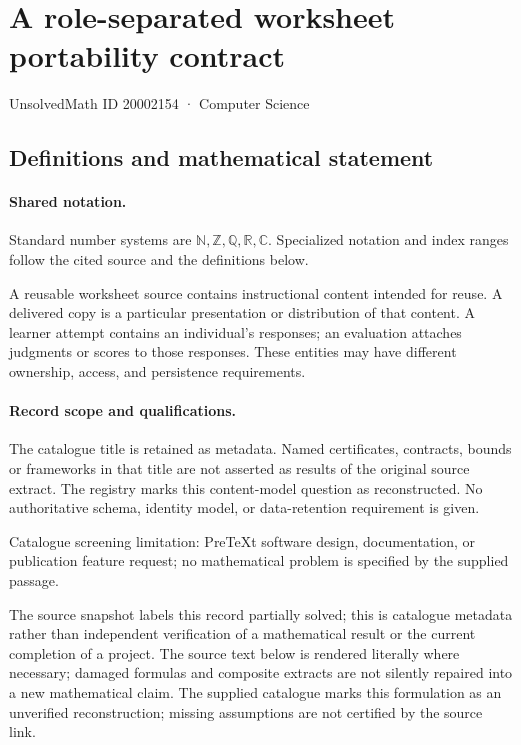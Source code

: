\documentclass[11pt]{article}
\begin{document}
\setcounter{section}{20002153}
\section{A role-separated worksheet portability contract}\label{20002154}
{\small\sffamily UnsolvedMath ID 20002154 · Computer Science}
\subsection{Definitions and mathematical statement}

\paragraph{Shared notation.}Standard number systems are $\mathbb N,\mathbb Z,\mathbb Q,\mathbb R,\mathbb C$. Specialized notation and index ranges follow the cited source and the definitions below.


A reusable worksheet source contains instructional content intended for reuse. A delivered copy is a particular presentation or distribution of that content. A learner attempt contains an individual's responses; an evaluation attaches judgments or scores to those responses. These entities may have different ownership, access, and persistence requirements.
\paragraph{Record scope and qualifications.}
The catalogue title is retained as metadata. Named certificates, contracts, bounds or frameworks in that title are not asserted as results of the original source extract.
The registry marks this content-model question as reconstructed. No authoritative schema, identity model, or data-retention requirement is given.

Catalogue screening limitation: PreTeXt software design, documentation, or publication feature request; no mathematical problem is specified by the supplied passage.

The source snapshot labels this record partially solved; this is catalogue metadata rather than independent verification of a mathematical result or the current completion of a project.
The source text below is rendered literally where necessary; damaged formulas and composite extracts are not silently repaired into a new mathematical claim.
The supplied catalogue marks this formulation as an unverified reconstruction; missing assumptions are not certified by the source link.
\end{document}
